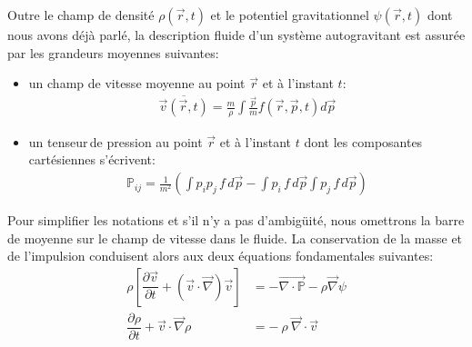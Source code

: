 Outre le champ de densité $\rho(\vec r, t)$ et le potentiel gravitationnel $\psi(\vec r, t)$ dont nous avons déjà parlé, la description fluide d'un
système autogravitant est assurée par les grandeurs moyennes suivantes:
\begin{itemize}
	\item un champ de vitesse moyenne au point $\vec{r}$ et à l'instant $t$:
		\begin{align*}
			\overline{{\vec{v}}\left(  {\vec{r}},t\right)  }
			=
			\frac{m}{\rho}\int \frac{\vec{p}}{m} f\left(  \vec{r},\vec{p},t\right)  d\vec{p}
		\end{align*}
	\item un \og tenseur\fg\,de pression au point $\vec{r}$ et à l'instant $t$ dont les composantes cartésiennes s'écrivent:
		\begin{align*}
			\mathbb{P}_{ij}
			=
			\frac{1}{m^{2}}\left(  \int p_{i}p_{j}\,f\,d\vec{p} - \int p_{i}\,f\,d\vec{p}\int p_{j}\,f\,d\vec{p}\right)
		\end{align*}
\end{itemize}
Pour simplifier les notations et s'il n'y a pas d'ambigüité, nous omettrons la barre de moyenne sur le champ de vitesse dans le fluide. La
conservation de la masse et de l'impulsion conduisent alors aux deux équations fondamentales suivantes:
\begin{subequations}\label{eq:sys-fluide}
	\begin{align}
		\rho\left[  \dfrac{\partial\vec{v}}{\partial t}+\left(  \vec{v}\cdot\vec{\nabla}\right)  \vec{v}\right]
		&=-\overrightarrow{\nabla\cdot\mathbb{P}}-\rho
		\vec{\nabla}\psi
		\label{eulerjeans} \\
		\dfrac{\partial\rho}{\partial t}+\vec{v}\cdot\vec{\nabla}\rho&=-\ \rho
		\ \vec{\nabla}\cdot\vec{v}
		 \label{continuitejeans}
	\end{align}
\end{subequations}

